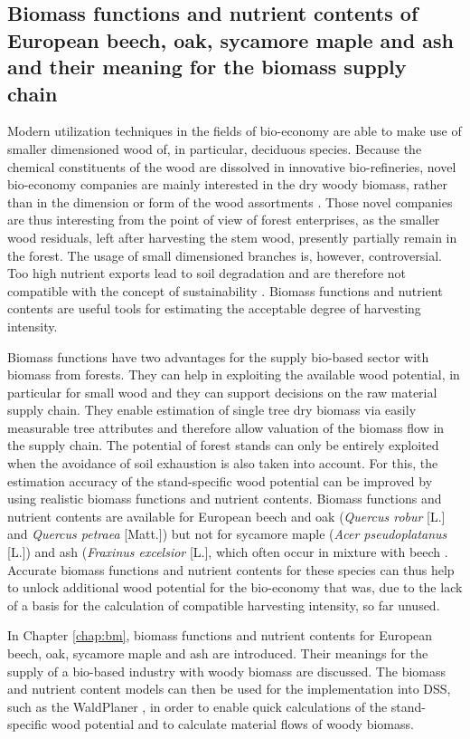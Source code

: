 \subsection{Biomass functions and nutrient contents of European beech, oak, sycamore maple and ash and their meaning for the biomass supply chain}
\label{subsec:intro:struct:bm}
Modern utilization techniques in the fields of bio-economy are able to make use of smaller dimensioned wood of, in particular, deciduous species. Because the chemical constituents of the wood are dissolved in innovative bio-refineries, novel bio-economy companies are mainly interested in the dry woody biomass, rather than in the dimension or form of the wood assortments \citep{ekman_2013}. Those novel companies are thus interesting from the point of view of forest enterprises, as the smaller wood residuals, left after harvesting the stem wood, presently partially remain in the forest. The usage of small dimensioned branches is, however, controversial. Too high nutrient exports lead to soil degradation and are therefore not compatible with the concept of sustainability \citep[p. 261]{pretzsch_2014}. Biomass functions and nutrient contents are useful tools for estimating the acceptable degree of harvesting intensity.

Biomass functions have two advantages for the supply bio-based sector with biomass from forests. They can help in exploiting the available wood potential, in particular for small wood and they can support decisions on the raw material supply chain. They enable estimation of single tree dry biomass via easily measurable tree attributes and therefore allow valuation of the biomass flow in the supply chain. The potential of forest stands can only be entirely exploited when the avoidance of soil exhaustion is also taken into account. For this, the estimation accuracy of the stand-specific wood potential can be improved by using realistic biomass functions and nutrient contents. Biomass functions and nutrient contents are available for European beech and oak (\textit{Quercus robur} [L.] and \textit{Quercus petraea} [Matt.]) but not for sycamore maple (\textit{Acer pseudoplatanus} [L.]) and ash (\textit{Fraxinus excelsior} [L.], which often occur in mixture with beech \citep{ti_2014}. Accurate biomass functions and nutrient contents for these species can thus help to unlock additional wood potential for the bio-economy that was, due to the lack of a basis for the calculation of compatible harvesting intensity, so far unused.

In Chapter \ref{chap:bm}, biomass functions and nutrient contents for European beech, oak, sycamore maple and ash are introduced. Their meanings for the supply of a bio-based industry with woody biomass are discussed. The biomass and nutrient content models can then be used for the implementation into DSS, such as the WaldPlaner \citep{hansen_2014}, in order to enable quick calculations of the stand-specific wood potential and to calculate material flows of woody biomass.

